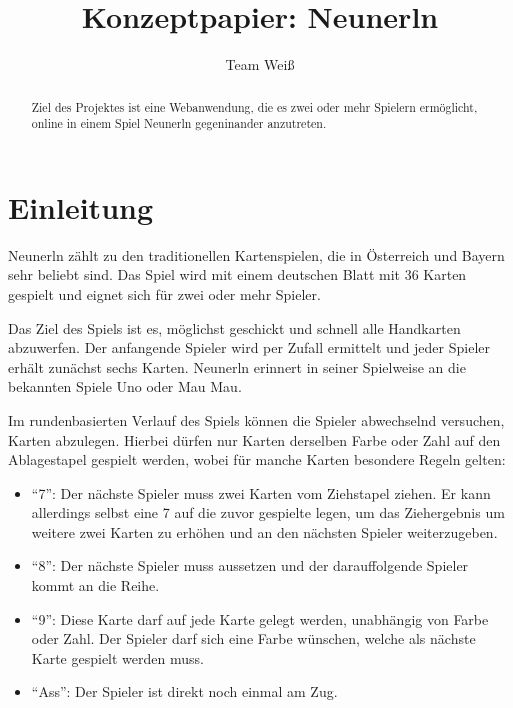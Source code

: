\documentclass[letterpaper, 10 pt, conference]{IEEEtran}
\title{\LARGE \bf Konzeptpapier: Neunerln}
\author{Team Weiß}
\begin{document}
\maketitle
\thispagestyle{empty}
\pagestyle{empty}


\begin{abstract}

Ziel des Projektes ist eine Webanwendung, die es zwei oder mehr Spielern ermöglicht, online in einem Spiel Neunerln gegeninander anzutreten.

\end{abstract}


\section{Einleitung}

Neunerln zählt zu den traditionellen Kartenspielen, die in Österreich und Bayern sehr beliebt sind. Das Spiel wird mit einem deutschen Blatt mit 36 Karten gespielt und eignet sich für zwei oder mehr Spieler. 

Das Ziel des Spiels ist es, möglichst geschickt und schnell alle Handkarten abzuwerfen. Der anfangende Spieler wird per Zufall ermittelt und jeder Spieler erhält zunächst sechs Karten. Neunerln erinnert in seiner Spielweise an die bekannten Spiele Uno oder Mau Mau.

Im rundenbasierten Verlauf des Spiels können die Spieler abwechselnd versuchen, Karten abzulegen. Hierbei dürfen nur Karten derselben Farbe oder Zahl auf den Ablagestapel gespielt werden, wobei für manche Karten besondere Regeln gelten:

\begin{itemize}

        \item ``7'': Der nächste Spieler muss zwei Karten vom Ziehstapel ziehen. Er kann allerdings selbst eine 7 auf die zuvor gespielte legen, um das Ziehergebnis um weitere zwei Karten zu erhöhen und an den nächsten Spieler weiterzugeben.
        \item ``8'': Der nächste Spieler muss aussetzen und der darauffolgende Spieler kommt an die Reihe.
        \item ``9'': Diese Karte darf auf jede Karte gelegt werden, unabhängig von Farbe oder Zahl. Der Spieler darf sich eine Farbe wünschen, welche als nächste Karte gespielt werden muss.
        \item ``Ass'': Der Spieler ist direkt noch einmal am Zug.
        
\end{itemize}
\end{document}
